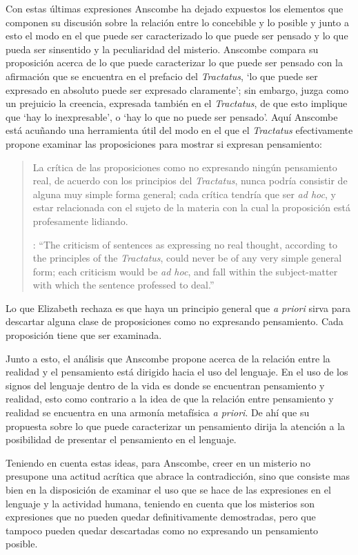Con estas últimas expresiones Anscombe ha dejado expuestos los elementos que componen su discusión sobre la relación entre lo concebible y lo posible y junto a esto el modo en el que puede ser caracterizado lo que puede ser pensado y lo que pueda ser sinsentido y la peculiaridad del misterio. Anscombe compara su proposición acerca de lo que puede caracterizar lo que puede ser pensado con la afirmación que se encuentra en el prefacio del \emph{Tractatus}, \enquote*{lo que puede ser expresado en absoluto puede ser expresado claramente}; sin embargo, juzga como un prejuicio la creencia, expresada también en el \emph{Tractatus}, de que esto implique que \enquote*{hay lo inexpresable}, o \enquote*{hay lo que no puede ser pensado}. Aquí Anscombe está acuñando una herramienta útil del modo en el que el \emph{Tractatus} efectivamente propone examinar las proposiciones para mostrar si expresan pensamiento: \blockquote[{\cite[151]{anscombe1959iwt}}: \enquote{The criticism of sentences as expressing no real thought, according to the principles of the \emph{Tractatus}, could never be of any very simple general form; each criticism would be \emph{ad hoc}, and fall within the subject-matter with which the sentence professed to deal.}]{La crítica de las proposiciones como no expresando ningún pensamiento real, de acuerdo con los principios del \emph{Tractatus}, nunca podría consistir de alguna muy simple forma general; cada crítica tendría que ser \emph{ad hoc}, y estar relacionada con el sujeto de la materia con la cual la proposición está profesamente lidiando.} Lo que Elizabeth rechaza es que haya un principio general que \emph{a priori} sirva para descartar alguna clase de proposiciones como no expresando pensamiento. Cada proposición tiene que ser examinada.

Junto a esto, el análisis que Anscombe propone acerca de la relación entre la realidad y el pensamiento está dirigido hacia el uso del lenguaje. En el uso de los signos del lenguaje dentro de la vida es donde se encuentran pensamiento y realidad, esto como contrario a la idea de que la relación entre pensamiento y realidad se encuentra en una armonía metafísica \emph{a priori}. De ahí que su propuesta sobre lo que puede caracterizar un pensamiento dirija la atención a la posibilidad de presentar el pensamiento en el lenguaje.

Teniendo en cuenta estas ideas, para Anscombe, creer en un misterio no presupone una actitud acrítica que abrace la contradicción, sino que consiste mas bien en la disposición de examinar el uso que se hace de las expresiones en el lenguaje y la actividad humana, teniendo en cuenta que los misterios son expresiones que no pueden quedar definitivamente demostradas, pero que tampoco pueden quedar descartadas como no expresando un pensamiento posible.



